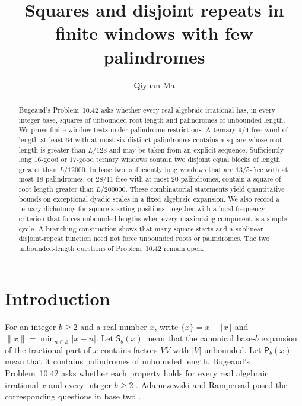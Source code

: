 \documentclass[11pt,reqno,a4paper]{amsart}
\title[Squares and disjoint repeats in finite windows]
{Squares and disjoint repeats in finite windows with few palindromes}
\date{}
\theoremstyle{remark}
\newcommand{\Z}{\mathbb Z}
\newcommand{\dist}[1]{\lVert#1\rVert}
\begin{document}
\author[Qiyuan Ma]{Qiyuan Ma\\[6pt]\protect\usebox{\affilbox}}

\begin{abstract}
Bugeaud's Problem~10.42 asks whether every real algebraic irrational has, in every integer base, squares of unbounded root length and palindromes of unbounded length. We prove finite-window tests under palindrome restrictions. A ternary $9/4$-free word of length at least $64$ with at most six distinct palindromes contains a square whose root length is greater than $L/128$ and may be taken from an explicit sequence. Sufficiently long $16$-good or $17$-good ternary windows contain two disjoint equal blocks of length greater than $L/12000$. In base two, sufficiently long windows that are $13/5$-free with at most $18$ palindromes, or $28/11$-free with at most $20$ palindromes, contain a square of root length greater than $L/200000$. These combinatorial statements yield quantitative bounds on exceptional dyadic scales in a fixed algebraic expansion. We also record a ternary dichotomy for square starting positions, together with a local-frequency criterion that forces unbounded lengths when every maximizing component is a simple cycle. A branching construction shows that many square starts and a sublinear disjoint-repeat function need not force unbounded roots or palindromes. The two unbounded-length questions of Problem~10.42 remain open.
\end{abstract}
\maketitle

\section{Introduction}\label{sec:intro}

For an integer $b\ge2$ and a real number $x$, write $\{x\}=x-\lfloor x\rfloor$ and $\dist{x}=\min_{n\in\Z}|x-n|$. Let $\mathsf S_b(x)$ mean that the canonical base-$b$ expansion of the fractional part of $x$ contains factors $VV$ with $|V|$ unbounded. Let $\mathsf P_b(x)$ mean that it contains palindromes of unbounded length. Bugeaud's Problem~10.42 asks whether each property holds for every real algebraic irrational $x$ and every integer $b\ge2$ \cite[p.~220]{Bugeaud}. Adamczewski and Rampersad posed the corresponding questions in base two \cite{AR}.
\end{document}
